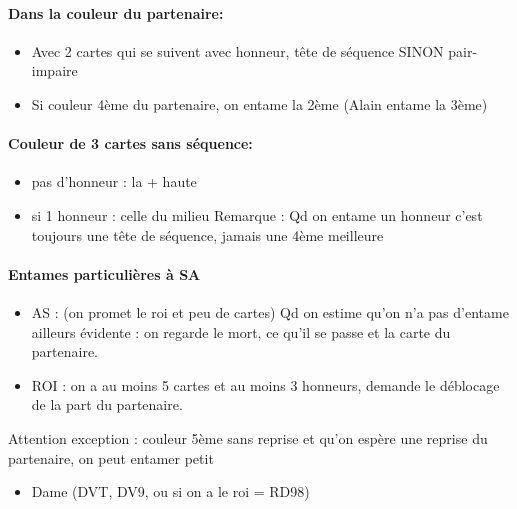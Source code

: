 \documentclass[a4paper]{article}
\begin{document}
\paragraph{Dans la couleur du partenaire:}

\begin{itemize}
\item Avec 2 cartes qui se suivent avec honneur, tête de séquence SINON pair-impaire

\item Si couleur 4ème du partenaire, on entame la 2ème (Alain entame la 3ème)

\end{itemize}

\paragraph{Couleur de 3 cartes sans séquence:}

\begin{itemize}
\item pas d’honneur : la + haute

\item si 1 honneur : celle du milieu
  Remarque : Qd on entame un honneur c’est toujours une tête de séquence, jamais une 4ème meilleure

\end{itemize}

\paragraph{Entames particulières à SA}

\begin{itemize}
\item AS : (on promet le roi et peu de cartes) Qd on estime qu’on n’a pas d’entame ailleurs évidente : on regarde le mort, ce qu’il se passe et la carte du partenaire.

\item ROI : on a au moins 5 cartes et au moins 3 honneurs, demande le déblocage de la part du partenaire.

\end{itemize}

Attention exception : couleur 5ème sans reprise et qu’on espère une reprise du partenaire, on peut entamer petit

\begin{itemize}
\item Dame (DVT, DV9, ou si on a le roi = RD98)

\end{itemize}
\end{document}
